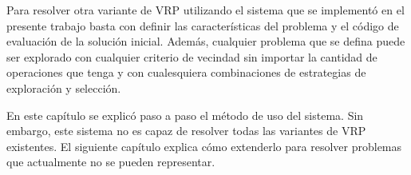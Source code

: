 Para resolver otra variante de VRP utilizando el sistema que se implementó en el presente trabajo basta con definir las características del problema y el código de evaluación de la solución inicial. Además, cualquier problema que se defina puede ser explorado con cualquier criterio de vecindad sin importar la cantidad de operaciones que tenga y con cualesquiera combinaciones de estrategias de exploración y selección.

En este capítulo se explicó paso a paso el método de uso del sistema. Sin embargo, este sistema no es capaz de resolver todas las variantes de VRP existentes. El siguiente capítulo explica cómo extenderlo para resolver problemas que actualmente no se pueden representar.








